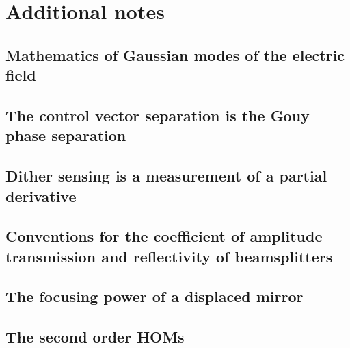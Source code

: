 \chapter{Additional notes}

\section{Mathematics of Gaussian modes of the electric field}

\label{ap:HGmode}

\section{The control vector separation is the Gouy phase separation}
\section{Dither sensing is a measurement of a partial derivative}

\section{Conventions for the coefficient of amplitude transmission and reflectivity of beamsplitters}

\section{The focusing power of a displaced mirror}

\section{The second order HOMs}

